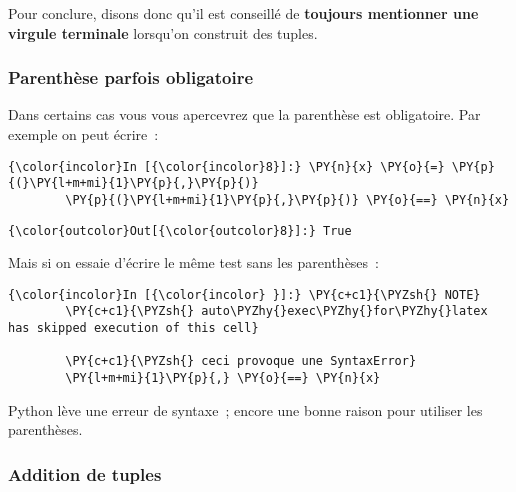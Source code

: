     Pour conclure, disons donc qu'il est conseillé de \textbf{toujours
mentionner une virgule terminale} lorsqu'on construit des tuples.

    \hypertarget{parenthuxe8se-parfois-obligatoire}{%
\subsubsection{Parenthèse parfois
obligatoire}\label{parenthuxe8se-parfois-obligatoire}}

    Dans certains cas vous vous apercevrez que la parenthèse est
obligatoire. Par exemple on peut écrire~:

    \begin{Verbatim}[commandchars=\\\{\},frame=single,framerule=0.3mm,rulecolor=\color{cellframecolor}]
{\color{incolor}In [{\color{incolor}8}]:} \PY{n}{x} \PY{o}{=} \PY{p}{(}\PY{l+m+mi}{1}\PY{p}{,}\PY{p}{)}
        \PY{p}{(}\PY{l+m+mi}{1}\PY{p}{,}\PY{p}{)} \PY{o}{==} \PY{n}{x}
\end{Verbatim}


\begin{Verbatim}[commandchars=\\\{\},frame=single,framerule=0.3mm,rulecolor=\color{cellframecolor}]
{\color{outcolor}Out[{\color{outcolor}8}]:} True
\end{Verbatim}
            
    Mais si on essaie d'écrire le même test sans les parenthèses~:

    \begin{Verbatim}[commandchars=\\\{\},frame=single,framerule=0.3mm,rulecolor=\color{cellframecolor}]
{\color{incolor}In [{\color{incolor} }]:} \PY{c+c1}{\PYZsh{} NOTE}
        \PY{c+c1}{\PYZsh{} auto\PYZhy{}exec\PYZhy{}for\PYZhy{}latex has skipped execution of this cell}
        
        \PY{c+c1}{\PYZsh{} ceci provoque une SyntaxError}
        \PY{l+m+mi}{1}\PY{p}{,} \PY{o}{==} \PY{n}{x}
\end{Verbatim}


    Python lève une erreur de syntaxe~; encore une bonne raison pour
utiliser les parenthèses.

    \hypertarget{addition-de-tuples}{%
\subsubsection{Addition de tuples}\label{addition-de-tuples}}

